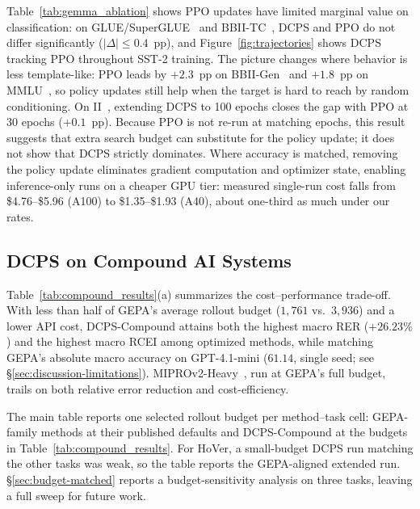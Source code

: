 \documentclass[runningheads]{llncs}
\begin{document}
Table~\ref{tab:gemma_ablation} shows PPO updates have limited marginal value on classification: on GLUE/SuperGLUE~\cite{wang2018glue,wang2019superglue} and BBII-TC~\cite{zhou2023ape}, DCPS and PPO do not differ significantly ($|\Delta|\le0.4$~pp), and Figure~\ref{fig:trajectories} shows DCPS tracking PPO throughout SST-2 training. The picture changes where behavior is less template-like: PPO leads by $+2.3$~pp on BBII-Gen~\cite{zhou2023ape} and $+1.8$~pp on MMLU~\cite{hendrycks2020mmlu}, so policy updates still help when the target is hard to reach by random conditioning. On II~\cite{honovich2022instruction}, extending DCPS to 100 epochs closes the gap with PPO at 30 epochs ($+0.1$~pp). Because PPO is not re-run at matching epochs, this result suggests that extra search budget can substitute for the policy update; it does not show that DCPS strictly dominates. Where accuracy is matched, removing the policy update eliminates gradient computation and optimizer state, enabling inference-only runs on a cheaper GPU tier: measured single-run cost falls from \$4.76--\$5.96 (A100) to \$1.35--\$1.93 (A40), about one-third as much under our rates.

\subsection{DCPS on Compound AI Systems}
\label{sec:phase2-results}

Table~\ref{tab:compound_results}(a) summarizes the cost--performance trade-off. With less than half of GEPA's average rollout budget ($1{,}761$ vs.\ $3{,}936$) and a lower API cost, DCPS-Compound attains both the highest macro RER ($+26.23\%$) and the highest macro RCEI among optimized methods, while matching GEPA's absolute macro accuracy on GPT-4.1-mini ($61.14$, single seed; see \S\ref{sec:discussion-limitations}). MIPROv2-Heavy~\cite{opsahl2024mipro}, run at GEPA's full budget, trails on both relative error reduction and cost-efficiency.

The main table reports one selected rollout budget per method--task cell: GEPA-family methods at their published defaults and DCPS-Compound at the budgets in Table~\ref{tab:compound_results}. For HoVer, a small-budget DCPS run matching the other tasks was weak, so the table reports the GEPA-aligned extended run. \S\ref{sec:budget-matched} reports a budget-sensitivity analysis on three tasks, leaving a full sweep for future work.
\end{document}
